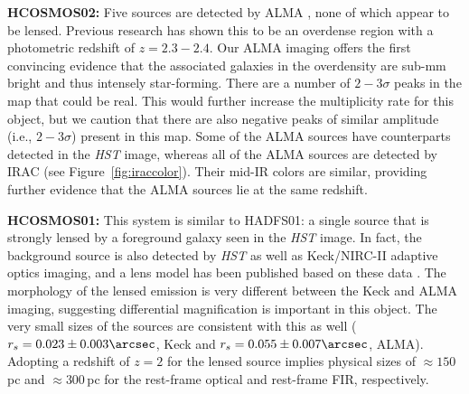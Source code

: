 \documentclass[iop]{emulateapj}
\begin{document}
{\bf HCOSMOS02:} Five sources are detected by ALMA \citep[the brightest of
which has already been detected;][]{Smolcic:2012zl}, none of which appear to be
lensed.  Previous research has shown this to be an overdense region \citep[this
object is called COSBO3 in][]{Aravena:2010fr} with a photometric redshift of
$z=2.3-2.4$.  Our ALMA imaging offers the first convincing evidence that the
associated galaxies in the overdensity are sub-mm bright and thus intensely
star-forming.  There are a number of $2-3\sigma$ peaks in the map that could be
real.  This would further increase the multiplicity rate for this object, but
we caution that there are also negative peaks of similar amplitude (i.e.,
$2-3\sigma$) present in this map.  Some of the ALMA sources have counterparts
detected in the {\it HST} image, whereas all of the ALMA sources are detected
by IRAC (see Figure~\ref{fig:iraccolor}).  Their mid-IR colors are similar,
providing further evidence that the ALMA sources lie at the same redshift.  

{\bf HCOSMOS01:} This system is similar to HADFS01: a single source that is
strongly lensed by a foreground galaxy seen in the {\it HST} image.  In fact,
the background source is also detected by {\it HST} as well as Keck/NIRC-II
adaptive optics imaging, and a lens model has been published based on these
data \citep{Calanog:2014lr}.  The morphology of the lensed emission is very
different between the Keck and ALMA imaging, suggesting differential
magnification is important in this object.  The very small sizes of the sources
are consistent with this as well ($r_s = 0.023 \pm 0.003\arcsec$, Keck and $r_s
= 0.055 \pm 0.007\arcsec$, ALMA).  Adopting a redshift of $z=2$ for the lensed
source implies physical sizes of $\approx 150\,$pc and $\approx 300\,$pc for
the rest-frame optical and rest-frame FIR, respectively.
\end{document}
